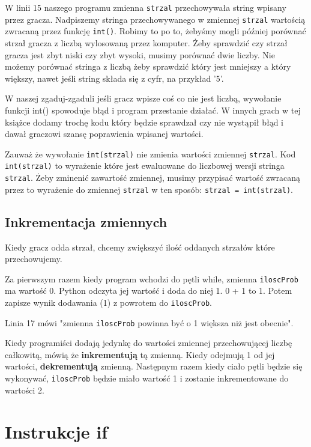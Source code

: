 \documentclass{book}
\begin{document}
W linii 15 naszego programu zmienna \lstinline{strzal} przechowywała string wpisany przez gracza. Nadpiszemy stringa przechowywanego w zmiennej \lstinline{strzal} wartością zwracaną przez funkcję \lstinline{int()}. Robimy to po to, żebyśmy mogli później porównać strzał gracza z liczbą wylosowaną przez komputer. Żeby sprawdzić czy strzał gracza jest zbyt niski czy zbyt wysoki, musimy porównać dwie liczby. Nie możemy porównać stringa z liczbą żeby sprawdzić który jest mniejszy a który większy, nawet jeśli string składa się z cyfr, na przykład '5'.

W naszej zgaduj-zgaduli jeśli gracz wpisze coś co nie jest liczbą, wywołanie funkcji int() spowoduje błąd i program przestanie działać. W innych grach w tej książce dodamy trochę kodu który będzie sprawdzał czy nie wystąpił błąd i dawał graczowi szansę poprawienia wpisanej wartości.

Zauważ że wywołanie \lstinline{int(strzal)} nie zmienia wartości zmiennej \lstinline{strzal}. Kod \lstinline{int(strzal)} to wyrażenie które jest ewaluowane do liczbowej wersji stringa \lstinline{strzal}. Żeby zminenić zawartość zmiennej, musimy przypisać wartość zwracaną przez to wyrażenie do zmiennej \lstinline{strzal} w ten sposób: \lstinline{strzal = int(strzal)}.

\subsection{Inkrementacja zmiennych}



Kiedy gracz odda strzał, chcemy zwiększyć ilość oddanych strzałów które przechowujemy.

Za pierwszym razem kiedy program wchodzi do pętli while, zmienna \lstinline{iloscProb} ma wartość 0. Python odczyta jej wartość i doda do niej 1. 0 + 1 to 1. Potem zapisze wynik dodawania (1) z powrotem do \lstinline{iloscProb}.

Linia 17 mówi "zmienna \lstinline{iloscProb} powinna być o 1 większa niż jest obecnie".

Kiedy programiści dodają jedynkę do wartości zmiennej przechowującej liczbę całkowitą, mówią że {\bf inkrementują} tą zmienną. Kiedy odejmują 1 od jej wartości, {\bf dekrementują} zmienną. Następnym razem kiedy ciało pętli będzie się wykonywać, \lstinline{iloscProb} będzie miało wartość 1 i zostanie inkrementowane do wartości 2.

\section{Instrukcje if}
\end{document}
